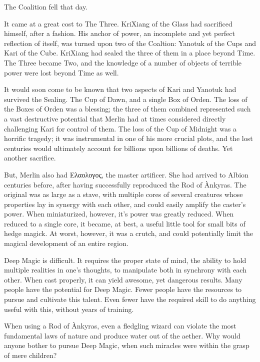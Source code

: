 The Coalition fell that day.

It came at a great cost to The Three. KriXiang of the Glass had sacrificed himself, after a fashion. His anchor of power, an incomplete and yet perfect reflection of itself, was turned upon two of the Coaltion: Yanotuk of the Cups and Kari of the Cube. KriXiang had sealed the three of them in a place beyond Time. The Three became Two, and the knowledge of a number of objects of terrible power were lost beyond Time as well.

It would soon come to be known that two aspects of Kari and Yanotuk had survived the Sealing. The Cup of Dawn, and a single Box of Orden. The loss of the Boxes of Orden was a blessing; the three of them combined represented such a vast destructive potential that Merlin had at times considered directly challenging Kari for control of them. The loss of the Cup of Midnight was a horrific tragedy; it was instrumental in one of his more crucial plots, and the lost centuries would ultimately account for billions upon billions of deaths. Yet another sacrifice.

But, Merlin also had Ελαολογος, the master artificer. She had arrived to Albion centuries before, after having successfully reproduced the Rod of Ànkyras. The original was as large as a stave, with multiple cores of several creatures whose properties lay in synergy with each other, and could easily amplify the caster’s power. When miniaturized, however, it’s power was greatly reduced. When reduced to a single core, it became, at best, a useful little tool for small bits of hedge magick. At worst, however, it was a crutch, and could potentially limit the magical development of an entire region.

Deep Magic is difficult. It requires the proper state of mind, the ability to hold multiple realities in one’s thoughts, to manipulate both in synchrony with each other. When cast properly, it can yield awesome, yet dangerous results. Many people have the potential for Deep Magic. Fewer people have the resources to pursue and cultivate this talent. Even fewer have the required skill to do anything useful with this, without years of training.

When using a Rod of Ànkyras, even a fledgling wizard can violate the most fundamental laws of nature and produce water out of the aether. Why would anyone bother to pursue Deep Magic, when such miracles were within the grasp of mere children?

